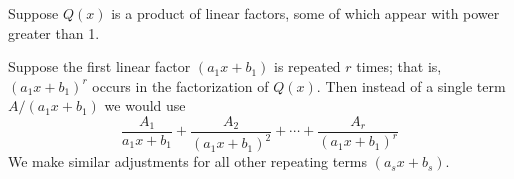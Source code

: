 \begin{frame}
Suppose $Q(x)$ is a product of linear factors, some of which appear with power greater than 1.

Suppose the first linear factor $(a_1x+b_1)$ is repeated $r$ times; that is, $(a_1x+b_1)^r$ occurs in the factorization of $Q(x)$.  Then instead of a single term $A/(a_1x+b_1)$ we would use
\[
\frac{A_1}{a_1x+b_1}%
 + \frac{A_2}{(a_1x+b_1)^2}%
 + \cdots %
 + \frac{A_r}{(a_1x+b_1)^r}%
\]
We make similar adjustments for all other repeating terms $(a_sx+b_s)$.
\end{frame}
